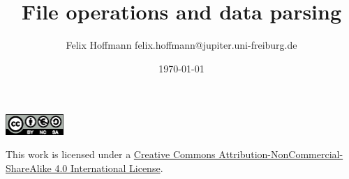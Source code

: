 \documentclass[xcolor=table,10pt,handout]{beamer}
\title {File operations and data parsing}
\author[Felix Hoffmann]{Felix Hoffmann \vspace{0.25cm} \newline \small felix.hoffmann@jupiter.uni-freiburg.de}
\institute[BCF]{Bernstein Center Freiburg}
\date{\today}
\begin{document}


\begin{frame} 
  \titlepage
\end{frame}

\begin{frame}
  \begin{center} 

    \vspace{5.95cm}

    \includegraphics[width=2.2cm]{by-nc-sa_eu.eps}

    \vspace{0.25cm}

    \small
    This work is licensed under a
    \href{http://creativecommons.org/licenses/by-nc-sa/4.0/}{Creative
      Commons Attribution-NonCommercial-ShareAlike 4.0 International
      License}.

  \end{center}
\end{frame}










\end{document}

